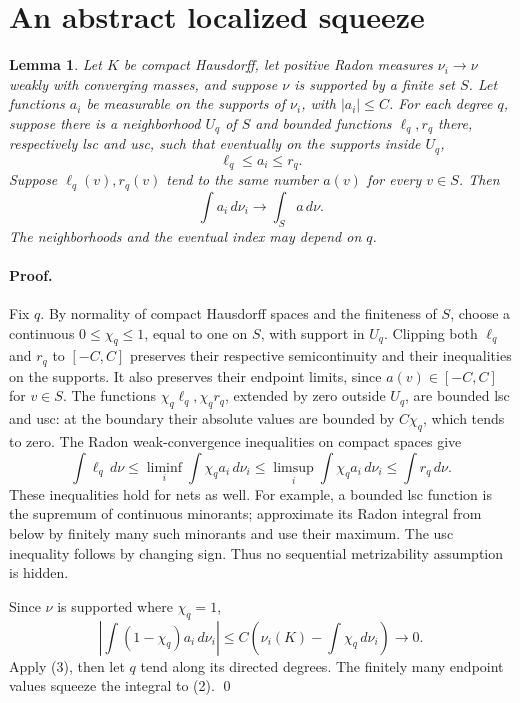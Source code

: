 \documentclass[10pt]{article}
\newtheorem{lemma}{Lemma}
\begin{document}
\section{An abstract localized squeeze}
\begin{lemma}\label{squeeze}
Let $K$ be compact Hausdorff, let positive Radon measures $\nu_i\to\nu$
weakly with converging masses, and suppose $\nu$ is supported by a finite
set $S$. Let functions $a_i$ be measurable on the supports of $\nu_i$,
with $|a_i|\le C$. For each degree $q$, suppose there is a neighborhood
$U_q$ of $S$ and bounded functions $\ell_q,r_q$ there, respectively lsc
and usc, such that eventually on the supports inside $U_q$,
\[
 \ell_q\le a_i\le r_q.
\]
Suppose $\ell_q(v),r_q(v)$ tend to the same number $a(v)$ for every
$v\in S$. Then
\[
                   \int a_i\,d\nu_i\longrightarrow\int_S a\,d\nu.
 \tag{2}
\]
The neighborhoods and the eventual index may depend on $q$.
\end{lemma}

\paragraph{Proof.}
Fix $q$. By normality of compact Hausdorff spaces and the finiteness of
$S$, choose a continuous $0\le\chi_q\le1$, equal to one on $S$, with
support in $U_q$. Clipping both $\ell_q$ and $r_q$ to $[-C,C]$
preserves their respective semicontinuity and their inequalities on
the supports. It also preserves their endpoint limits, since
$a(v)\in[-C,C]$ for $v\in S$.
The functions $\chi_q\ell_q,\chi_qr_q$, extended by zero outside
$U_q$, are bounded lsc and usc: at the boundary their absolute values
are bounded by $C\chi_q$, which tends to zero. The Radon weak-convergence
inequalities on compact spaces give
\[
 \int\ell_q\,d\nu
 \le\liminf_i\int\chi_q a_i\,d\nu_i
 \le\limsup_i\int\chi_q a_i\,d\nu_i
 \le\int r_q\,d\nu.
 \tag{3}
\]
These inequalities hold for nets as well. For example, a bounded lsc
function is the supremum of continuous minorants; approximate its Radon
integral from below by finitely many such minorants and use their maximum.
The usc inequality follows by changing sign. Thus no sequential
metrizability assumption is hidden.

Since $\nu$ is supported where $\chi_q=1$,
\[
 \left|\int(1-\chi_q)a_i\,d\nu_i\right|
        \le C\left(\nu_i(K)-\int\chi_q\,d\nu_i\right)\to0.
\]
Apply (3), then let $q$ tend along its directed degrees. The finitely
many endpoint values squeeze the integral to (2). \qed
\end{document}
